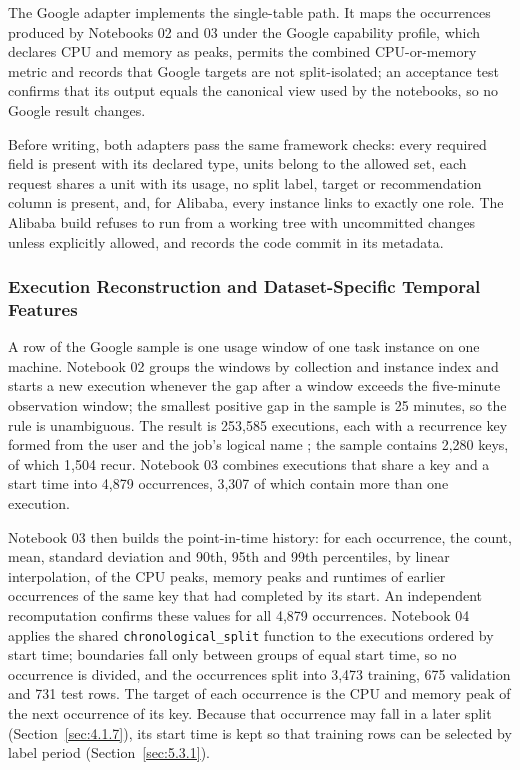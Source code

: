 \documentclass{IEEEtran}
\begin{document}
The Google adapter implements the single-table path. It maps the occurrences produced by Notebooks 02 and 03 under the Google capability profile, which declares CPU and memory as peaks, permits the combined CPU-or-memory metric and records that Google targets are not split-isolated; an acceptance test confirms that its output equals the canonical view used by the notebooks, so no Google result changes.

Before writing, both adapters pass the same framework checks: every required field is present with its declared type, units belong to the allowed set, each request shares a unit with its usage, no split label, target or recommendation column is present, and, for Alibaba, every instance links to exactly one role. The Alibaba build refuses to run from a working tree with uncommitted changes unless explicitly allowed, and records the code commit in its metadata.

\subsubsection{Execution Reconstruction and Dataset-Specific Temporal Features}\label{sec:5.1.2}

A row of the Google sample is one usage window of one task instance on one machine. Notebook 02 groups the windows by collection and instance index and starts a new execution whenever the gap after a window exceeds the five-minute observation window; the smallest positive gap in the sample is 25 minutes, so the rule is unambiguous. The result is 253,585 executions, each with a recurrence key formed from the user and the job's logical name \cite{ref7}; the sample contains 2,280 keys, of which 1,504 recur. Notebook 03 combines executions that share a key and a start time into 4,879 occurrences, 3,307 of which contain more than one execution.

Notebook 03 then builds the point-in-time history: for each occurrence, the count, mean, standard deviation and 90th, 95th and 99th percentiles, by linear interpolation, of the CPU peaks, memory peaks and runtimes of earlier occurrences of the same key that had completed by its start. An independent recomputation confirms these values for all 4,879 occurrences. Notebook 04 applies the shared \texttt{chronological\_split} function to the executions ordered by start time; boundaries fall only between groups of equal start time, so no occurrence is divided, and the occurrences split into 3,473 training, 675 validation and 731 test rows. The target of each occurrence is the CPU and memory peak of the next occurrence of its key. Because that occurrence may fall in a later split (Section~\ref{sec:4.1.7}), its start time is kept so that training rows can be selected by label period (Section~\ref{sec:5.3.1}).
\end{document}
